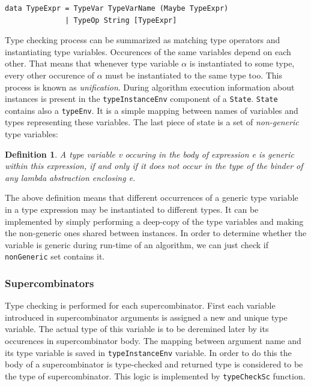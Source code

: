 \documentclass[12pt,a4paper]{report}
\newtheorem{definition}{Definition}[chapter]
\begin{document}
\vspace*{0.2in}
\begin{lstlisting}
data TypeExpr = TypeVar TypeVarName (Maybe TypeExpr)
              | TypeOp String [TypeExpr]
\end{lstlisting}

Type checking process can be summarized as matching type operators and
instantiating type variables. Occurences of the same variables depend on each
other. That means that whenever type variable $\alpha$ is instantiated to some
type, every other occurence of $\alpha$ must be instantiated to the same type
too. This process is known as \textit{unification}. During algorithm execution
information about instances is present in the \texttt{typeInstanceEnv}
component of a \texttt{State}. \texttt{State} contains also a \texttt{typeEnv}.
It is a simple mapping between names of variables and types representing these
variables. The last piece of state is a set of \textit{non-generic} type
variables:

\begin{definition}
  A type variable v occuring in the body of expression e is generic within this
  expression, if and only if it does not occur in the type of the binder of any
  lambda abstraction enclosing e.
\end{definition}

The above definition means that different occurrences of a generic type
variable in a type expression may be instantiated to different types. It can be
implemented by simply performing a deep-copy of the type variables and making
the non-generic ones shared between instances. In order to determine whether
the variable is generic during run-time of an algorithm, we can just check if
\texttt{nonGeneric} set contains it.

\subsubsection{Supercombinators}
Type checking is performed for each supercombinator. First each variable
introduced in supercombinator arguments is assigned a new and unique type
variable. The actual type of this variable is to be deremined later by its
occurences in supercombinator body. The mapping between argument name and its
type variable is saved in \texttt{typeInstanceEnv} variable. In order to do
this the body of a supercombinator is type-checked and returned type is
considered to be the type of supercombinator. This logic is implemented by
\texttt{typeCheckSc} function.
\end{document}

